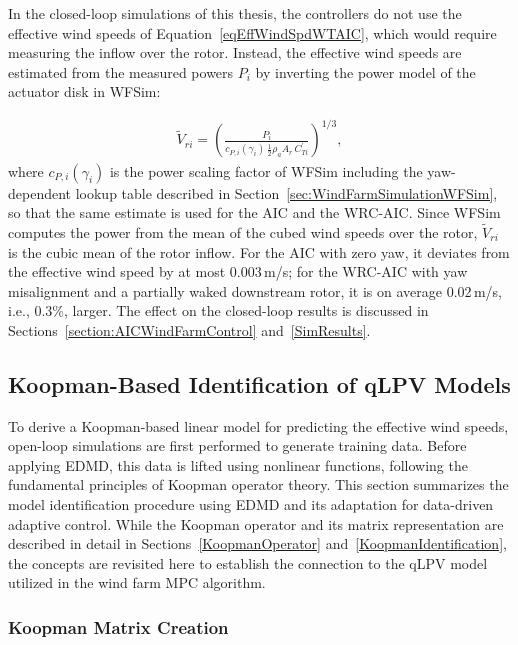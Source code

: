 In the closed-loop simulations of this thesis, the controllers do not use the effective wind speeds of Equation~\eqref{eqEffWindSpdWTAIC}, which would require measuring the inflow over the rotor. Instead, the effective wind speeds are estimated from the measured powers $P_i$ by inverting the power model of the actuator disk in WFSim:

\begin{align} \label{eq:VrFromPower}
    \tilde{V}_{ri} = \left( \frac{P_i}{c_{P,i}(\gamma_i)\, \tfrac{1}{2}\rho_a A_r \, C_{Ti}^\prime} \right)^{1/3},
\end{align}
where $c_{P,i}(\gamma_i)$ is the power scaling factor of WFSim including the yaw-dependent lookup table described in Section~\ref{sec:WindFarmSimulationWFSim}, so that the same estimate is used for the AIC and the WRC-AIC. Since WFSim computes the power from the mean of the cubed wind speeds over the rotor, $\tilde{V}_{ri}$ is the cubic mean of the rotor inflow. For the AIC with zero yaw, it deviates from the effective wind speed by at most 0.003\,m/s; for the WRC-AIC with yaw misalignment and a partially waked downstream rotor, it is on average 0.02\,m/s, i.e., 0.3\%, larger. The effect on the closed-loop results is discussed in Sections~\ref{section:AICWindFarmControl} and~\ref{SimResults}.


\subsection{Koopman-Based Identification of qLPV Models}
To derive a Koopman-based linear model for predicting the effective wind speeds, open-loop simulations are first performed to generate training data. Before applying EDMD, this data is lifted using nonlinear functions, following the fundamental principles of Koopman operator theory. This section summarizes the model identification procedure using EDMD and its adaptation for data-driven adaptive control. While the Koopman operator and its matrix representation are described in detail in Sections~\ref{KoopmanOperator} and~\ref{KoopmanIdentification}, the concepts are revisited here to establish the connection to the qLPV model utilized in the wind farm MPC algorithm.

\subsubsection{Koopman Matrix Creation}

